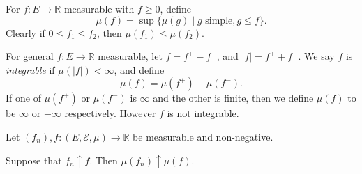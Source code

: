\documentclass[12pt]{article}
\begin{document}
\begin{definition}
	For $f : E \to \mathbb{R}$ measurable with $f \geq 0$, define
	\[
		\mu(f) = \sup \{ \mu(g) \mid g \text{ simple}, g \leq f\}.
	\]
	Clearly if $0 \leq f_1 \leq f_2$, then $\mu(f_1) \leq \mu(f_2)$.

	For general $f : E \to \mathbb{R}$ measurable, let $f = f^{+} - f^{-}$, and $|f| = f^{+} + f^{-}$. We say $f$ is \emph{integrable} if $\mu(|f|) < \infty$, and define
	\[
	\mu(f) = \mu(f^{+}) - \mu(f^{-}).
	\]
	If one of $\mu(f^{+})$ or $\mu(f^{-})$ is $\infty$ and the other is finite, then we define $\mu(f)$ to be $\infty$ or $-\infty$ respectively. However $f$ is not integrable.
\end{definition}

\begin{theorem}
	Let $(f_n), f : (E, \mathcal{E}, \mu) \to \mathbb{R}$ be measurable and non-negative.

	Suppose that $f_n \uparrow f$. Then $\mu(f_n) \uparrow \mu(f)$.
\end{theorem}
\end{document}
